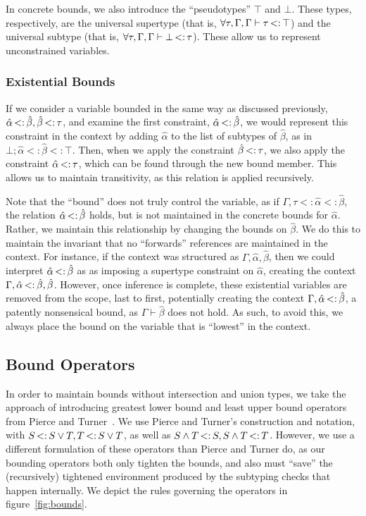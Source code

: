 \documentclass{sig-alternate}
\newcommand{\st}{\ensuremath{\hspace{-1px}<:\hspace{-1px}}}
\newcommand{\betahat}{\hat{\beta}}
\newcommand{\lub}{\ensuremath{\vee}}
\newcommand{\glb}{\ensuremath{\wedge}}
\newcommand{\ctxbsep}{;}
\newcommand{\tst}{{\scriptstyle{<:}}}
\newcommand{\bound}[3]{#1 \tst #2 \tst #3}
\begin{document}
In concrete bounds, we also introduce the ``pseudotypes'' $\top$ and $\bot$. These types, respectively, are the universal supertype (that is, $\forall\tau,\Gamma, \Gamma \vdash \tau \st \top$) and the universal subtype (that is, $\forall\tau,\Gamma, \Gamma \vdash \bot \st \tau$). These allow us to represent unconstrained variables.

\subsubsection{Existential Bounds}
If we consider a variable bounded in the same way as discussed previously, $\hat{\alpha} \st \hat{\beta}, \hat{\beta} \st \tau$, and examine the first constraint, $\hat{\alpha} \st \hat{\beta}$, we would represent this constraint in the context by adding $\hat{\alpha}$ to the list of subtypes of $\hat{\beta}$, as in $\bound{\bot\ctxbsep \hat{\alpha}}{\hat{\beta}}{\top}$. Then, when we apply the constraint $\hat{\beta} \st \tau$, we also apply the constraint $\hat{\alpha}\st \tau$, which can be found through the new bound member. This allows us to maintain transitivity, as this relation is applied recursively.

Note that the ``bound'' does not truly control the variable, as if $\Gamma, \bound{\tau}{\hat{\alpha}}{ \hat{\beta}}$, the relation $\hat{\alpha} \st \hat{\beta}$ holds, but is not maintained in the concrete bounds for $\hat{\alpha}$. Rather, we maintain this relationship by changing the bounds on $\hat{\beta}$. We do this to maintain the invariant that no ``forwards'' references are maintained in the context. For instance, if the context was structured as $\Gamma,\hat{\alpha},\hat{\beta}$, then we could interpret $\hat{\alpha}\st\hat{\beta}$ as as imposing a supertype constraint on $\hat{\alpha}$, creating the context $\Gamma,\hat{\alpha}\st\hat{\beta},\hat{\beta}$. However, once inference is complete, these existential variables are removed from the scope, last to first, potentially creating the context $\Gamma,\hat{\alpha}\st\hat{\beta}$, a patently nonsensical bound, as $\Gamma \vdash \betahat$ does not hold. As such, to avoid this, we always place the bound on the variable that is ``lowest'' in the context.
 
\subsection{Bound Operators}
In order to maintain bounds without intersection and union types, we take the approach of introducing greatest lower bound and least upper bound operators from Pierce and Turner~\cite{Pierce:2000:LTI:345099.345100}. We use Pierce and Turner's construction and notation, with $S \st S \lub T, T \st S \lub T$, as well as $S \glb T \st S, S \glb T \st T$. However, we use a different formulation of these operators than Pierce and Turner do, as our bounding operators both only tighten the bounds, and also must ``save'' the (recursively) tightened environment produced by the subtyping checks that happen internally. We depict the rules governing the operators in figure~\ref{fig:bounds}.
\end{document}
